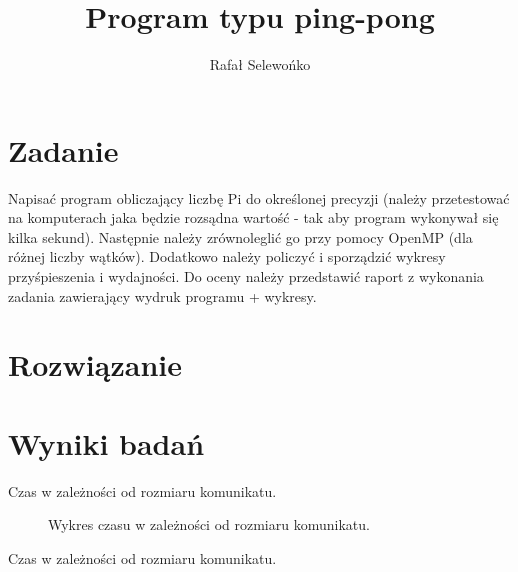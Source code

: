 \documentclass[a4paper,12pt]{article}
\title{Program typu ping-pong}
\author{Rafał Selewońko}
\begin{document}
\maketitle
 
\section{Zadanie}\label{sec:zadanie}
Napisać program obliczający liczbę Pi do określonej precyzji (należy przetestować na komputerach jaka będzie rozsądna wartość - tak aby program wykonywał się kilka sekund). Następnie należy zrównoleglić go przy pomocy OpenMP (dla różnej liczby wątków). Dodatkowo należy policzyć i sporządzić wykresy przyśpieszenia i wydajności. Do oceny należy przedstawić raport z wykonania zadania zawierający wydruk programu + wykresy.

\pagebreak
\section{Rozwiązanie}\label{sec:kod}



\section{Wyniki badań}

\begin{table}[t]
\centering
{}
\caption{Czas w zależności od rozmiaru komunikatu.}
\label{tabela_czas}
\end{table}

\begin{figure}[ht!]
    \centering
    \caption{Wykres czasu w zależności od rozmiaru komunikatu.}
    \label{wykres_czas}
\end{figure}

\begin{table}[t]
\centering
{}
\caption{Czas w zależności od rozmiaru komunikatu.}
\label{tabela_przepustowosc}
\end{table}
\end{document}
